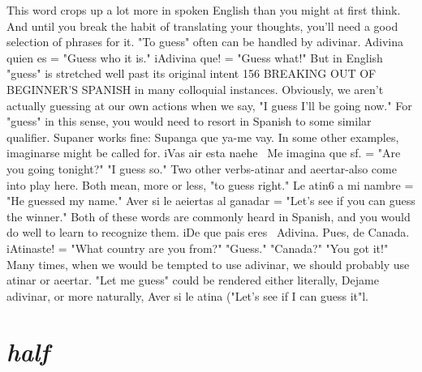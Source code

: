 \documentclass[14pt,a4paper,oneside]{memoir}
\begin{document}
{{{{%
This word crops up a lot more in spoken English than you
might at first think. And until you break the habit of translating your
thoughts, you'll need a good selection of phrases for it. "To guess" often can be handled by adivinar. Adivina quien es = "Guess who it
is." iAdivina que! = "Guess what!"
But in English "guess" is stretched well past its original intent
156 BREAKING OUT OF BEGINNER'S SPANISH
in many colloquial instances. Obviously, we aren't actually guessing at
our own actions when we say, "I guess I'll be going now." For "guess"
in this sense, you would need to resort in Spanish to some similar
qualifier. Supaner works fine: Supanga que ya-me vay. In some other
examples, imaginarse might be called for. iVas air esta naehe~ Me
imagina que sf. = "Are you going tonight?" "I guess so."
Two other verbs-atinar and aeertar-also come into play
here. Both mean, more or less, "to guess right." Le atin6 a mi nambre
= "He guessed my name." Aver si le aeiertas al ganadar = "Let's see
if you can guess the winner." Both of these words are commonly heard
in Spanish, and you would do well to learn to recognize them. iDe que
pais eres~ Adivina. Pues, de Canada. iAtinaste! = "What country are
you from?" "Guess." "Canada?" "You got it!" Many times, when we
would be tempted to use adivinar, we should probably use atinar or
aeertar. "Let me guess" could be rendered either literally, Dejame adivinar, or more naturally, Aver si le atina ("Let's see if I can guess it"l.

\section{\emph{half}}

}}}}
\end{document}
